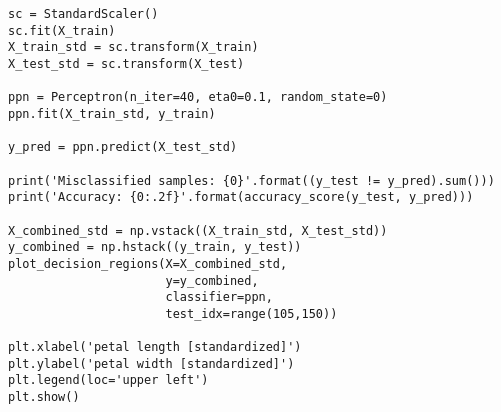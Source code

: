 \documentclass[12pt]{article}
\begin{document}
\begin{verbatim}
sc = StandardScaler()
sc.fit(X_train)
X_train_std = sc.transform(X_train)
X_test_std = sc.transform(X_test)

ppn = Perceptron(n_iter=40, eta0=0.1, random_state=0)
ppn.fit(X_train_std, y_train)

y_pred = ppn.predict(X_test_std)

print('Misclassified samples: {0}'.format((y_test != y_pred).sum()))
print('Accuracy: {0:.2f}'.format(accuracy_score(y_test, y_pred)))

X_combined_std = np.vstack((X_train_std, X_test_std))
y_combined = np.hstack((y_train, y_test))
plot_decision_regions(X=X_combined_std,
                      y=y_combined,
                      classifier=ppn,
                      test_idx=range(105,150))

plt.xlabel('petal length [standardized]') 
plt.ylabel('petal width [standardized]') 
plt.legend(loc='upper left')
plt.show()
\end{verbatim}
\end{document}
